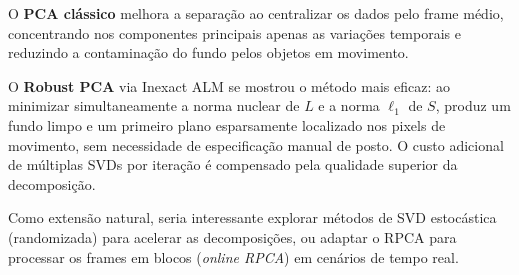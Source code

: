 \documentclass[12pt, a4paper]{article}
\begin{document}
O \textbf{PCA clássico} melhora a separação ao centralizar os dados pelo frame
médio, concentrando nos componentes principais apenas as variações temporais e
reduzindo a contaminação do fundo pelos objetos em movimento.

O \textbf{Robust PCA} via Inexact ALM se mostrou o método mais eficaz: ao
minimizar simultaneamente a norma nuclear de $L$ e a norma $\ell_1$ de $S$,
produz um fundo limpo e um primeiro plano esparsamente localizado nos pixels
de movimento, sem necessidade de especificação manual de posto. O custo adicional
de múltiplas SVDs por iteração é compensado pela qualidade superior da decomposição.

Como extensão natural, seria interessante explorar métodos de SVD estocástica
(randomizada) para acelerar as decomposições, ou adaptar o RPCA para processar
os frames em blocos (\emph{online RPCA}) em cenários de tempo real.

\newpage

\printbibliography[heading=bibintoc, title={Referências}]
\end{document}
